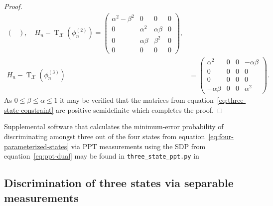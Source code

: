 \documentclass[11pt]{article}
\theoremstyle{definition}
\newcommand{\pt}{\operatorname{T}}
\newcommand{\X}{\mathcal{X}}
\begin{document}
\begin{proof}
\begin{equation}
\begin{aligned}
\begin{pmatrix}
            \end{pmatrix}, \quad 
            H_n - \pt_{\X}\left(\phi_n^{(2)}\right) =
            \begin{pmatrix}
                \alpha^2 - \beta^2 & 0 & 0 & 0 \\
                0 & \alpha^2 & \alpha\beta & 0 \\
                0 & \alpha\beta & \beta^2 & 0 \\
                0 & 0 & 0 & 0
            \end{pmatrix}, \\
            H_n - \pt_{\X} \left(\phi_n^{(3)}\right) &= 
            \begin{pmatrix}
                \alpha^2 & 0 & 0 & -\alpha\beta \\
                0 & 0 & 0 & 0 \\
                0 & 0 & 0 & 0 \\
                -\alpha\beta & 0 & 0 & \alpha^2
            \end{pmatrix}. 
        \end{aligned}
    \end{equation}
    As $0 \leq \beta \leq \alpha \leq 1$ it may be verified that the matrices
    from equation~\eqref{eq:three-state-constraint} are positive semidefinite
    which completes the proof.
\end{proof}
Supplemental software that calculates the minimum-error probability of
discriminating amongst three out of the four states from
equation~\eqref{eq:four-parameterized-states} via PPT measurements using the
SDP from equation~\eqref{eq:ppt-dual} may be found in
\texttt{three\_state\_ppt.py} in~\cite{russo2020ppt}

\subsection*{Discrimination of three states via separable measurements}
\label{sec:discrim-three-states-sep-no-resource}
\end{document}
